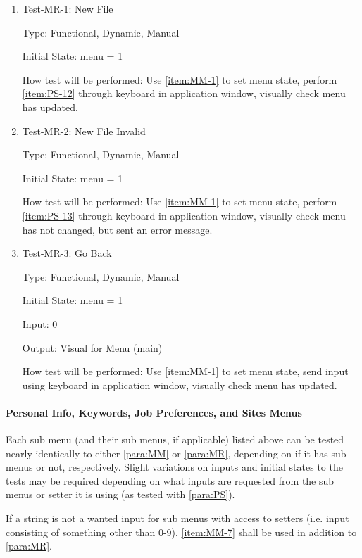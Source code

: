\documentclass[12pt, titlepage]{article}
\makeatletter
\def\itemlabel#1#2{\def\@currentlabel{#2}\phantomsection\label{#1}}
\makeatother
\begin{document}
\begin{enumerate}
\item{Test-MR-1: New File\\}

Type: Functional, Dynamic, Manual

Initial State: menu = 1

How test will be performed: Use \ref{item:MM-1} to set menu state, perform \ref{item:PS-12} through keyboard in application window, visually check menu has updated.
\item{Test-MR-2: New File Invalid\\}

Type: Functional, Dynamic, Manual

Initial State: menu = 1

How test will be performed: Use \ref{item:MM-1} to set menu state, perform \ref{item:PS-13} through keyboard in application window, visually check menu has not changed, but sent an error message.
\item{Test-MR-3: Go Back\\}

Type: Functional, Dynamic, Manual

Initial State: menu = 1

Input: 0

Output: Visual for Menu (main)

How test will be performed: Use \ref{item:MM-1} to set menu state, send input using keyboard in application window, visually check menu has updated.
\end{enumerate}

\paragraph{Personal Info, Keywords, Job Preferences, and Sites Menus\\} \itemlabel{para:MO}{MO Tests} %

Each sub menu (and their sub menus, if applicable) listed above can be tested nearly identically to either \ref{para:MM} or \ref{para:MR}, depending on if it has sub menus or not, respectively. Slight variations on inputs and initial states to the tests may be required depending on what inputs are requested from the sub menus or setter it is using (as tested with \ref{para:PS}).

If a string is not a wanted input for sub menus with access to setters (i.e. input consisting of something other than 0-9), \ref{item:MM-7} shall be used in addition to \ref{para:MR}. 
\end{document}
